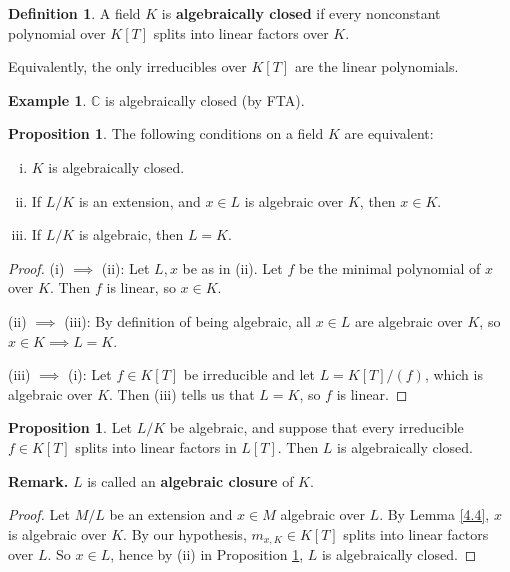 \documentclass{article}
\theoremstyle{definition}
\newtheorem{prop}[theorem]{Proposition}
\newtheorem{example}{Example}[section]
\newtheorem{defn}{Definition}[section]
\begin{document}
\begin{defn}
    A field $K$ is \textbf{algebraically closed} if every nonconstant polynomial over $K[T]$ splits into linear factors over $K$.
    \vspace{1mm}
    
    Equivalently, the only irreducibles over $K[T]$ are the linear polynomials.
\end{defn}
\begin{example}
    $\mathbb{C}$ is algebraically closed (by FTA).
\end{example}
\begin{prop}\label{14.1}
    The following conditions on a field $K$ are equivalent:
    \begin{enumerate}[(i)]
        \item $K$ is algebraically closed.
        \item If $L/K$ is an extension, and $x \in L$ is algebraic over $K$, then $x \in K$.
        \item If $L/K$ is algebraic, then $L=K$.
    \end{enumerate}
\end{prop}
\begin{proof}
    (i) $\implies$ (ii): Let $L,x$ be as in (ii). Let $f$ be the minimal polynomial of $x$ over $K$. Then $f$ is linear, so $x \in K$.
    \vspace{1mm}
    
    (ii) $\implies$ (iii): By definition of being algebraic, all $x \in L$ are algebraic over $K$, so $x \in K \implies L=K$.
    \vspace{1mm}
    
    (iii) $\implies$ (i): Let $f \in K[T]$ be irreducible and let $L=K[T]/(f)$, which is algebraic over $K$. Then (iii) tells us that $L=K$, so $f$ is linear.
\end{proof}
\begin{prop}\label{14.2}
    Let $L/K$ be algebraic, and suppose that every irreducible $f \in K[T]$ splits into linear factors in $L[T]$. Then $L$ is algebraically closed. 
\end{prop}
\textbf{Remark.} $L$ is called an \textbf{algebraic closure} of $K$.
\begin{proof}
    Let $M/L$ be an extension and $x \in M$ algebraic over $L$. By Lemma \ref{4.4}, $x$ is algebraic over $K$. By our hypothesis, $m_{x,K} \in K[T]$ splits into linear factors over $L$. So $x \in L$, hence by (ii) in Proposition \ref{14.1}, $L$ is algebraically closed.
\end{proof}
\end{document}
